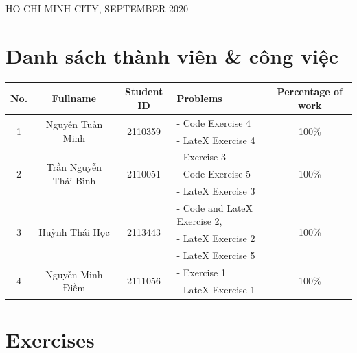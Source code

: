 \documentclass[a4paper]{article}
\begin{document}
\begin{titlepage}
\begin{center}
{\footnotesize HO CHI MINH CITY, SEPTEMBER 2020}
\end{center}
\end{titlepage}



\newpage
\tableofcontents
\newpage


\section{Danh sách thành viên \& công việc}

\begin{center}
\begin{tabular}{|c|c|c|l|c|}
\hline
\textbf{No.} & \textbf{Fullname} & \textbf{Student ID} & \textbf{Problems} & \textbf{Percentage of work}\\
\hline 
\multirow{2}{*}{1} & \multirow{2}{*}{Nguyễn Tuấn Minh} & \multirow{2}{*}{2110359} & - Code Exercise 4& \multirow{2}{*}{100\%}\\
 & &  & - LateX Exercise 4 &\\
\hline 
\multirow{3}{*}{2} & \multirow{3}{*}{Trần Nguyễn Thái Bình} & \multirow{3}{*}{2110051} & - Exercise 3 & \multirow{3}{*}{100\%}\\
 & &  & - Code Exercise 5 &\\
 & &  & - LateX Exercise 3 &\\
\hline
\multirow{3}{*}{3} & \multirow{3}{*}{Huỳnh Thái Học} & \multirow{3}{*}{2113443} & - Code and LateX Exercise 2, & \multirow{3}{*}{100\%}\\
 & &  & - LateX Exercise 2  &\\
 & &  & - LateX Exercise 5 &\\
\hline
\multirow{2}{*}{4} & \multirow{2}{*}{Nguyễn Minh Điềm} & \multirow{2}{*}{2111056} & - Exercise 1 & \multirow{2}{*}{100\%} \\
 & &  & - LateX Exercise 1\\
\hline
\end{tabular}
\end{center}



\section{Exercises}
\end{document}
